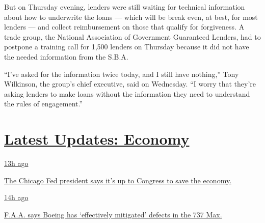 But on Thursday evening, lenders were still waiting for technical
information about how to underwrite the loans --- which will be break
even, at best, for most lenders --- and collect reimbursement on those
that qualify for forgiveness. A trade group, the National Association of
Government Guaranteed Lenders, had to postpone a training call for 1,500
lenders on Thursday because it did not have the needed information from
the S.B.A.

``I've asked for the information twice today, and I still have
nothing,'' Tony Wilkinson, the group's chief executive, said on
Wednesday. ``I worry that they're asking lenders to make loans without
the information they need to understand the rules of engagement.''

\hypertarget{latest-updates-economy}{%
\section{\texorpdfstring{\href{https://www.nytimes.com/live/2020/08/03/business/stock-market-today-coronavirus?action=click\&pgtype=Article\&state=default\&region=MAIN_CONTENT_1\&context=storylines_live_updates}{Latest
Updates:
Economy}}{Latest Updates: Economy}}\label{latest-updates-economy}}

\href{https://www.nytimes.com/live/2020/08/03/business/stock-market-today-coronavirus?action=click\&pgtype=Article\&state=default\&region=MAIN_CONTENT_1\&context=storylines_live_updates\#the-chicago-fed-president-says-its-up-to-congress-to-save-the-economy}{13h
ago}

\href{https://www.nytimes.com/live/2020/08/03/business/stock-market-today-coronavirus?action=click\&pgtype=Article\&state=default\&region=MAIN_CONTENT_1\&context=storylines_live_updates\#the-chicago-fed-president-says-its-up-to-congress-to-save-the-economy}{The
Chicago Fed president says it's up to Congress to save the economy.}

\href{https://www.nytimes.com/live/2020/08/03/business/stock-market-today-coronavirus?action=click\&pgtype=Article\&state=default\&region=MAIN_CONTENT_1\&context=storylines_live_updates\#faa-says-boeing-has-effectively-mitigated-defects-in-the-737-max}{14h
ago}

\href{https://www.nytimes.com/live/2020/08/03/business/stock-market-today-coronavirus?action=click\&pgtype=Article\&state=default\&region=MAIN_CONTENT_1\&context=storylines_live_updates\#faa-says-boeing-has-effectively-mitigated-defects-in-the-737-max}{F.A.A.
says Boeing has `effectively mitigated' defects in the 737 Max.}

